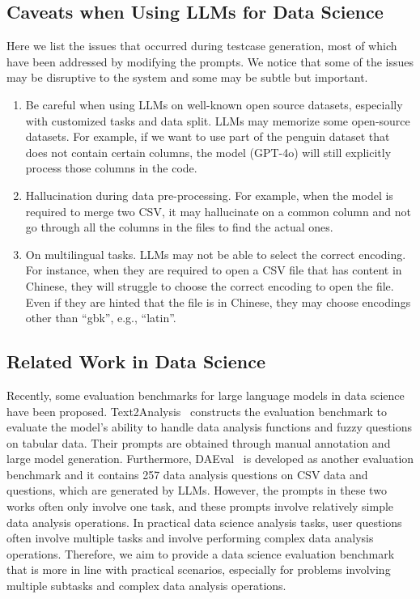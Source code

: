 \subsection{Caveats when Using LLMs for Data Science}
Here we list the issues that occurred during testcase generation, most of which have been addressed by modifying the prompts. We notice that some of the issues may be disruptive to the system and some may be subtle but important.
\begin{enumerate}
    \item Be careful when using LLMs on well-known open source datasets, especially with customized tasks and data split. LLMs may memorize some open-source datasets. For example, if we want to use part of the penguin dataset that does not contain certain columns, the model (GPT-4o) will still explicitly process those columns in the code.
    \item Hallucination during data pre-processing. For example, when the model is required to merge two CSV, it may hallucinate on a common column and not go through all the columns in the files to find the actual ones.
    \item On multilingual tasks. LLMs may not be able to select the correct encoding. For instance, when they are required to open a CSV file that has content in Chinese, they will struggle to choose the correct encoding to open the file. Even if they are hinted that the file is in Chinese, they may choose encodings other than ``gbk'', e.g., ``latin''.
\end{enumerate}





\subsection{Related Work in Data Science}
Recently, some evaluation benchmarks for large language models in data science have been proposed. 
Text2Analysis~\citep{he2024text2analysis} constructs the evaluation benchmark to evaluate the model's ability to handle data analysis functions and fuzzy questions on tabular data. Their prompts are obtained through manual annotation and large model generation.
Furthermore, DAEval~\citep{huinfiagent} is developed as another evaluation benchmark and it contains 257 data analysis questions on CSV data and questions, which are generated by LLMs.
However, the prompts in these two works often only involve one task, and these prompts involve relatively simple data analysis operations.
In practical data science analysis tasks, user questions often involve multiple tasks and involve performing complex data analysis operations.
Therefore, we aim to provide a data science evaluation benchmark that is more in line with practical scenarios, especially for problems involving multiple subtasks and complex data analysis operations.



